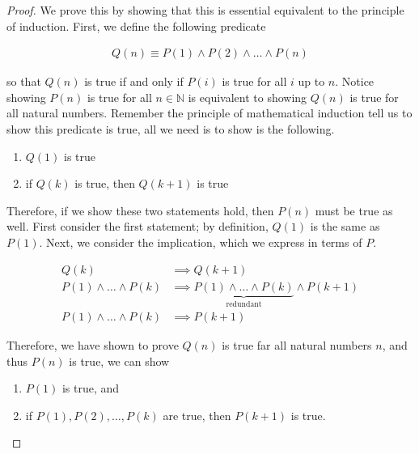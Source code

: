 \begin{proof}
	We prove this by showing that this is essential equivalent to the principle of induction. First, we define the following predicate
	
	\begin{align*}
		Q(n) \equiv P(1) \land P(2) \land \dots \land P(n)
	\end{align*}
	
	so that $Q(n)$ is true if and only if $P(i)$ is true for all $i$ up to $n$. Notice showing $P(n)$ is true for all $n \in \mathbb{N}$ is equivalent to showing $Q(n)$ is true for all natural numbers. Remember the principle of mathematical induction tell us to show this predicate is true, all we need is to show is the following.

	\vspace{\baselineskip}
	\begin{enumerate}
		\item $Q(1)$ is true
		\item if $Q(k)$ is true, then $Q(k + 1)$ is true
	\end{enumerate}
	\vspace{\baselineskip}

	Therefore, if we show these two statements hold, then $P(n)$ must be true as well. First consider the first statement; by definition, $Q(1)$ is the same as $P(1)$. Next, we consider the implication, which we express in terms of $P$.
	
	\begin{align*}
		Q(k) &\implies Q(k + 1) \\
		P(1) \land \dots \land P(k) &\implies \underbrace{P(1) \land \dots \land P(k)}_\text{redundant} \land P(k + 1) \\
		P(1) \land \dots \land P(k) &\implies P(k + 1)
	\end{align*}
	
	Therefore, we have shown to prove $Q(n)$ is true far all natural numbers $n$, and thus $P(n)$ is true, we can show
	
	\vspace{\baselineskip}
	\begin{enumerate}
		\item $P(1)$ is true, and
		\item if $P(1), P(2), \dots, P(k)$ are true, then $P(k + 1)$ is true.
	\end{enumerate}
\end{proof}
\vspace{\baselineskip}

